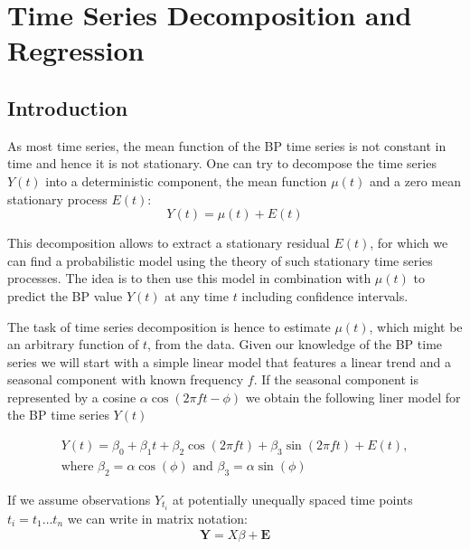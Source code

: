 

\chapter{Time Series Decomposition and Regression}


\section{Introduction}

As most time series, the mean function of the BP time series is not constant in time and hence it is not stationary.
One can try to decompose the time series $Y(t)$ into a deterministic component, the mean function $\mu(t)$
and a zero mean stationary process $E(t)$:
\[ Y(t)= \mu(t) + E(t) \]

This decomposition allows to extract a stationary residual $E(t)$, for which we can find a probabilistic model
using the theory of such stationary time series processes. The idea is to then use this model in combination
with $\mu(t)$ to predict the BP value $Y(t)$ at any time $t$ including confidence intervals.

The task of time series decomposition is hence to estimate $\mu(t)$, which might be an arbitrary function of $t$, from the data.
Given our knowledge of the BP time series we will start with a simple linear model that
features a linear trend and a seasonal component with known frequency $f$.
If the seasonal component is represented by a cosine $\alpha \cos(2 \pi f t - \phi)$ we obtain the
following liner model for the BP time series $Y(t)$

\begin{gather*}
Y(t) = \beta_0 + \beta_1 t + \beta_2 \cos(2 \pi f t) + \beta_3 \sin(2 \pi f t) + E(t), \\
\text{where $\beta_2 = \alpha \cos(\phi)$ and $\beta_3 = \alpha \sin(\phi)$}
\end{gather*}

If we assume observations $Y_{t_i}$ at potentially unequally spaced
time points $t_i = t_1 \dots t_n$ we can write in matrix notation:
\begin{gather*}
\mathbf{Y} = X \beta + \mathbf{E}
\end{gather*}

